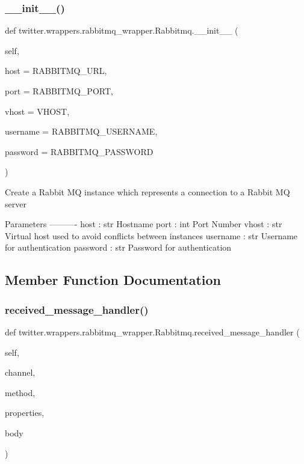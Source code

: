 \subsubsection{\texorpdfstring{\+\_\+\+\_\+init\+\_\+\+\_\+()}{\_\_init\_\_()}}
{\footnotesize\ttfamily def twitter.\+wrappers.\+rabbitmq\+\_\+wrapper.\+Rabbitmq.\+\_\+\+\_\+init\+\_\+\+\_\+ (\begin{DoxyParamCaption}\item[{}]{self,  }\item[{}]{host = {\ttfamily RABBITMQ\+\_\+URL},  }\item[{}]{port = {\ttfamily RABBITMQ\+\_\+PORT},  }\item[{}]{vhost = {\ttfamily VHOST},  }\item[{}]{username = {\ttfamily RABBITMQ\+\_\+USERNAME},  }\item[{}]{password = {\ttfamily RABBITMQ\+\_\+PASSWORD} }\end{DoxyParamCaption})}

\begin{DoxyVerb}Create a Rabbit MQ instance which represents a connection to a Rabbit MQ server

Parameters
----------
host : str
    Hostname
port : int
    Port Number
vhost : str
    Virtual host used to avoid conflicts between instances
username : str
    Username for authentication
password : str
    Password for authentication
\end{DoxyVerb}
 

\subsection{Member Function Documentation}
\mbox{\label{classtwitter_1_1wrappers_1_1rabbitmq__wrapper_1_1Rabbitmq_a910cadec1f119ffca78becc55af22a43}} 
\subsubsection{\texorpdfstring{received\+\_\+message\+\_\+handler()}{received\_message\_handler()}}
{\footnotesize\ttfamily def twitter.\+wrappers.\+rabbitmq\+\_\+wrapper.\+Rabbitmq.\+received\+\_\+message\+\_\+handler (\begin{DoxyParamCaption}\item[{}]{self,  }\item[{}]{channel,  }\item[{}]{method,  }\item[{}]{properties,  }\item[{}]{body }\end{DoxyParamCaption})}

